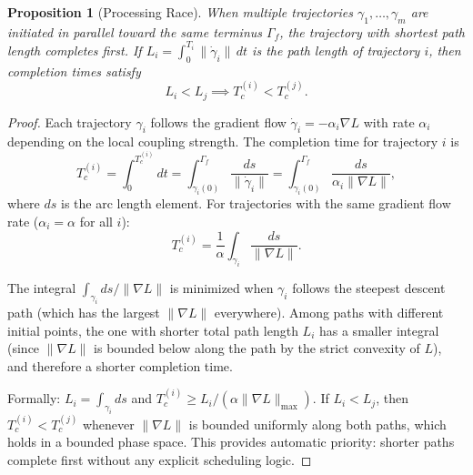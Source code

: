 \documentclass[twocolumn,10pt]{article}
\newtheorem{proposition}[theorem]{Proposition}
\theoremstyle{remark}
\begin{document}
\begin{proposition}[Processing Race]
\label{prop:race}
When multiple trajectories $\gamma_1, \ldots, \gamma_m$ are initiated in parallel toward the same terminus $\Gamma_f$, the trajectory with shortest path length completes first. If $L_i = \int_0^{T_i} \|\dot{\gamma}_i\|\, dt$ is the path length of trajectory $i$, then completion times satisfy
\begin{equation}
L_i < L_j \implies T_c^{(i)} < T_c^{(j)}.
\label{eq:race}
\end{equation}
\end{proposition}

\begin{proof}
Each trajectory $\gamma_i$ follows the gradient flow $\dot{\gamma}_i = -\alpha_i \nabla L$ with rate $\alpha_i$ depending on the local coupling strength. The completion time for trajectory $i$ is
\begin{equation}
T_c^{(i)} = \int_0^{T_c^{(i)}} dt = \int_{\gamma_i(0)}^{\Gamma_f} \frac{ds}{\|\dot{\gamma}_i\|} = \int_{\gamma_i(0)}^{\Gamma_f} \frac{ds}{\alpha_i \|\nabla L\|},
\end{equation}
where $ds$ is the arc length element. For trajectories with the same gradient flow rate ($\alpha_i = \alpha$ for all $i$):
\begin{equation}
T_c^{(i)} = \frac{1}{\alpha} \int_{\gamma_i} \frac{ds}{\|\nabla L\|}.
\end{equation}

The integral $\int_{\gamma_i} ds / \|\nabla L\|$ is minimized when $\gamma_i$ follows the steepest descent path (which has the largest $\|\nabla L\|$ everywhere). Among paths with different initial points, the one with shorter total path length $L_i$ has a smaller integral (since $\|\nabla L\|$ is bounded below along the path by the strict convexity of $L$), and therefore a shorter completion time.

Formally: $L_i = \int_{\gamma_i} ds$ and $T_c^{(i)} \geq L_i / (\alpha \|\nabla L\|_{\max})$. If $L_i < L_j$, then $T_c^{(i)} < T_c^{(j)}$ whenever $\|\nabla L\|$ is bounded uniformly along both paths, which holds in a bounded phase space. This provides automatic priority: shorter paths complete first without any explicit scheduling logic.
\end{proof}
\end{document}
